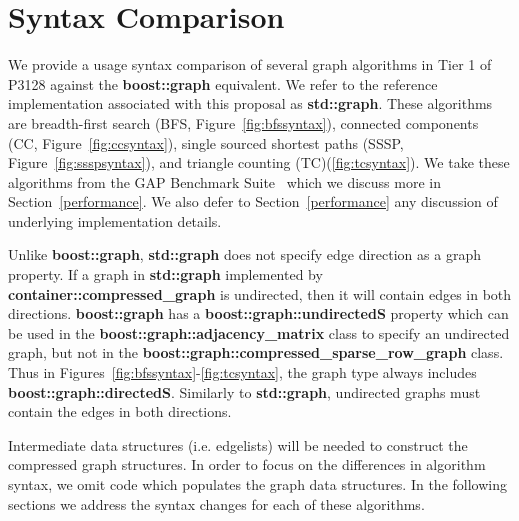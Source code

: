 
\clearpage

\section{Syntax Comparison} \label{syntax}
We provide a usage syntax comparison of several graph algorithms
in Tier 1 of P3128 against the \textbf{boost::graph} equivalent.
We refer to the reference implementation associated with this proposal
as \textbf{std::graph}.
These algorithms are breadth-first search (BFS, Figure~\ref{fig:bfssyntax}),
connected components (CC, Figure~\ref{fig:ccsyntax}),
single sourced shortest paths (SSSP, Figure~\ref{fig:ssspsyntax}),
and triangle counting (TC)(\ref{fig:tcsyntax}).
We take these algorithms from the GAP Benchmark Suite~\cite{gapbs_2023}
which we discuss more in Section~\ref{performance}.
We also defer to Section~\ref{performance} any discussion of
underlying implementation details.

Unlike \textbf{boost::graph}, \textbf{std::graph} does not
specify edge direction as a graph property.
If a graph in \textbf{std::graph} implemented by \textbf{container::compressed\_graph}
is undirected, then it will contain edges in both directions.
\textbf{boost::graph} has a \textbf{boost::graph::undirectedS} property
which can be used in the \textbf{boost::graph::adjacency\_matrix} class
to specify an undirected graph, but
not in the \textbf{boost::graph::compressed\_sparse\_row\_graph} class.
Thus in Figures~\ref{fig:bfssyntax}-\ref{fig:tcsyntax}, the graph type always includes \textbf{boost::graph::directedS}.
Similarly to \textbf{std::graph}, undirected graphs must contain the edges in both directions.

Intermediate data structures (i.e. edgelists) will be needed
to construct the compressed graph structures.
In order to focus on the differences in algorithm syntax, we omit
code which populates the graph data structures.
In the following sections we address the syntax changes for each of
these algorithms.

